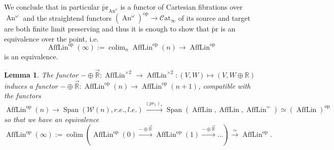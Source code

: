 \documentclass{article}
\newcommand{\xto}{\xrightarrow}
\newcommand{\R}{\mathbb{R}} %
\newcommand{\cO}{\AffLin}
\newcommand{\op}{\mathrm{op}}
\newcommand{\pr}{\mathrm{pr}}
\DeclareMathOperator{\An}{An}
\newcommand{\catinfty}{\mathcal{C}\mathrm{at}_{\infty}}
\DeclareMathOperator{\AffLin}{AffLin}
\DeclareMathOperator*{\colim}{colim}
\DeclareMathOperator{\Span}{Span}
\newtheorem{lemma}{Lemma}
\begin{document}
    We conclude that in particular $\overleftarrow{\pr}_{\An^\omega}$ is a functor of Cartesian fibrations over $\An^\omega$
    and the straightend functors $(\An^\omega)^\op \to \catinfty$ of its source and target 
    are both finite limit preserving 
    and thus it is enough to show that $\overleftarrow{\pr}$ is an equivalence over the point, i.e.
    \[ 
        \AffLin^\op(\infty) := \colim_n \AffLin^\op(n) \to \AffLin^\op
    \]
    is an equivalence. 

  \begin{lemma}\label{colimitlemma}
    The functor $-\oplus \overrightarrow{\R} \colon {\cO}^{\times 2} \to {\cO}^{\times 2}
      \colon (V,W) \mapsto (V, W\oplus \R)$ induces a functor
    $-\oplus \overrightarrow{\R} \colon \cO^\op(n)\to \cO^\op(n+1)$,
    compatible with the functors
    $\cO^\op(n) \to \Span({\mathcal W(n)}, r.e., l.e. ) \xto{(pr_1)_*} \Span(\cO,
      {\cO}, {\cO}^\simeq) \simeq ({\cO})^\op$
    so that we have an equivalence
    \[
      \AffLin^\op(\infty) := \colim (\cO^\op(0) \xto{-\oplus \overrightarrow{\R}} \cO^\op(1)
      \xto{-\oplus \overrightarrow{\R}} \dots) \xrightarrow{\simeq} {\cO}^\op 
      .\]
  \end{lemma}
\end{document}
